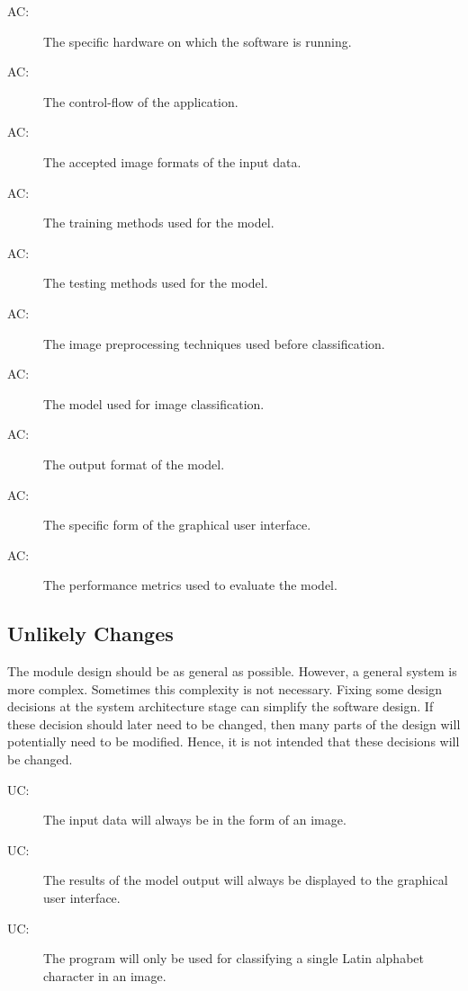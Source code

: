 \documentclass[12pt, titlepage]{article}
\newcounter{acnum}
\newcommand{\actheacnum}{AC\theacnum}
\newcounter{ucnum}
\newcommand{\uctheucnum}{UC\theucnum}
\begin{document}
\begin{description}
\item[ \actheacnum \label{acHardware}:] The specific
hardware on which the software is running.
\item[ \actheacnum \label{acApplication}:] The
control-flow of the application.
\item[ \actheacnum \label{acInput}:] The accepted image
formats of the input data.
\item[ \actheacnum \label{acTraining}:] The training
methods used for the model.
\item[ \actheacnum \label{acTesting}:] The testing methods
used for the model.
\item[ \actheacnum \label{acPreprocessing}:] The image
preprocessing techniques used before classification.
\item[ \actheacnum \label{acModel}:] The model used for
image classification.
\item[ \actheacnum \label{acOutput}:] The output format of
the model.
\item[ \actheacnum \label{acGUI}:] The specific form of
the graphical user interface.
\item[ \actheacnum \label{acPerformance}:] The performance
metrics used to evaluate the model.
\end{description}


\subsection{Unlikely Changes} \label{SecUchange}

The module design should be as general as possible. However, a general system is
more complex. Sometimes this complexity is not necessary. Fixing some design
decisions at the system architecture stage can simplify the software design. If
these decision should later need to be changed, then many parts of the design
will potentially need to be modified. Hence, it is not intended that these
decisions will be changed.

\begin{description}
\item[ \uctheucnum \label{ucInput}:] The input data will
always be in the form of an image.
\item[ \uctheucnum \label{ucOutput}:] The results of the
model output will always be displayed to the graphical user interface.
\item[ \uctheucnum \label{ucPurpose}:] The program will
only be used for classifying a single Latin alphabet character in an image.
\end{description}
\end{document}
